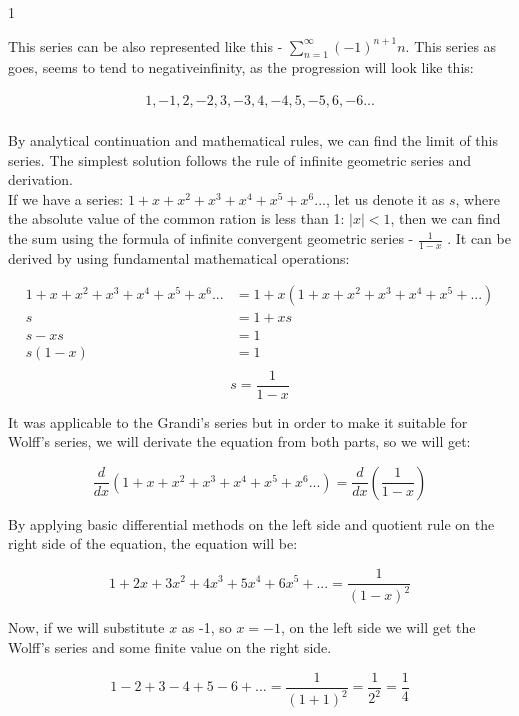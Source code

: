 1\documentclass[a4paper]{article}
\begin{document}
This series can be also represented like this - $\sum_{n=1}^\infty (-1)^{n+1}n$. This series as goes, seems to tend to negativeinfinity,
as the progression will look like this:

\begin{align*}
1, -1, 2, -2, 3, -3, 4, -4, 5, -5, 6, -6...\\
\end{align*}

By analytical continuation and mathematical rules, we can find the limit of this series. The simplest
solution follows the rule of infinite geometric series and derivation.\\

If we have a series: $1+x+x^2+x^3+x^4+x^5+x^6...$, let us denote it as $s$, where the absolute value of the common
ration is less than 1: $|x| < 1$, then we can find the sum using the formula of infinite convergent
geometric series - $\frac{1}{1-x}$ . It can be derived by using fundamental mathematical operations:

\begin{align*}
  1+x+x^2+x^3+x^4+x^5+x^6...&=1+x(1+x+x^2+x^3+x^4+x^5+...)\\
  s&=1+xs\\
  s-xs&=1\\
  s(1-x)&=1\\
\end{align*}
\begin{equation}
  s=\frac{1}{1-x}
  \end{equation}

It was applicable to the Grandi's series but in order to make it suitable for Wolff's series, we will
derivate the equation from both parts, so we will get:

\begin{equation*}
  \frac{d}{dx}(1+x+x^2+x^3+x^4+x^5+x^6...)=\frac{d}{dx}(\frac{1}{1-x})
  \end{equation*}

By applying basic differential methods on the left side and quotient rule on the right side of the
equation, the equation will be:

\begin{equation*}
  1+2x+3x^2+4x^3+5x^4+6x^5+...=\frac{1}{(1-x)^2}
  \end{equation*}

Now, if we will substitute $x$ as -1, so $x = − 1$, on the left side we will get the Wolff's series and
some finite value on the right side.

\begin{equation}
  1-2+3-4+5-6+...=\frac{1}{(1+1)^2}=\frac{1}{2^2}=\frac{1}{4}
  \label{Wolff}
\end{equation}
\end{document}
